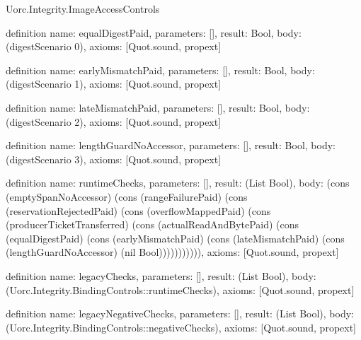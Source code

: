 \begin{lexlean}{Uorc.Integrity.ImageAccessControls}
\begin{semanticmodule}
definition{
  name: equalDigestPaid,
  parameters: [],
  result: Bool,
  body: (digestScenario 0),
  axioms: [Quot.sound, propext]
}

definition{
  name: earlyMismatchPaid,
  parameters: [],
  result: Bool,
  body: (digestScenario 1),
  axioms: [Quot.sound, propext]
}

definition{
  name: lateMismatchPaid,
  parameters: [],
  result: Bool,
  body: (digestScenario 2),
  axioms: [Quot.sound, propext]
}

definition{
  name: lengthGuardNoAccessor,
  parameters: [],
  result: Bool,
  body: (digestScenario 3),
  axioms: [Quot.sound, propext]
}

definition{
  name: runtimeChecks,
  parameters: [],
  result: (List Bool),
  body: (cons (emptySpanNoAccessor) (cons (rangeFailurePaid) (cons (reservationRejectedPaid) (cons (overflowMappedPaid) (cons (producerTicketTransferred) (cons (actualReadAndBytePaid) (cons (equalDigestPaid) (cons (earlyMismatchPaid) (cons (lateMismatchPaid) (cons (lengthGuardNoAccessor) (nil Bool))))))))))),
  axioms: [Quot.sound, propext]
}

definition{
  name: legacyChecks,
  parameters: [],
  result: (List Bool),
  body: (Uorc.Integrity.BindingControls::runtimeChecks),
  axioms: [Quot.sound, propext]
}

definition{
  name: legacyNegativeChecks,
  parameters: [],
  result: (List Bool),
  body: (Uorc.Integrity.BindingControls::negativeChecks),
  axioms: [Quot.sound, propext]
}
\end{semanticmodule}
\end{lexlean}
